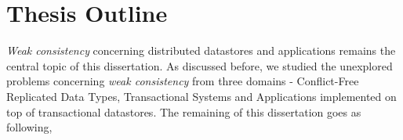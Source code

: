%

\section{Thesis Outline}

\emph{Weak consistency} concerning distributed datastores and applications remains the central topic of this dissertation. As discussed before, we studied the unexplored problems concerning \emph{weak consistency} from three domains - Conflict-Free Replicated Data Types, Transactional Systems and Applications implemented on top of transactional datastores. The remaining of this dissertation goes as following,

